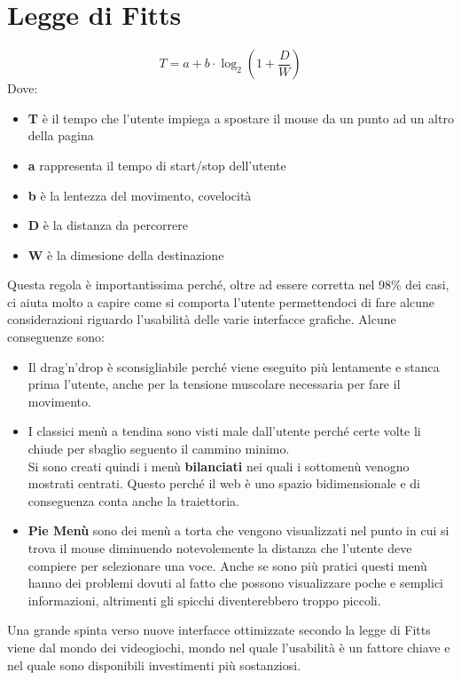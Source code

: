 \section{Legge di Fitts}
$$ T = a + b\cdot\log_{2}(1 + \frac{D}{W}) $$
Dove:
\begin{itemize}
\item \textbf{T} è il tempo che l'utente impiega a spostare il mouse da un punto ad un altro della pagina
\item \textbf{a} rappresenta il tempo di start/stop dell'utente
\item \textbf{b} è la lentezza del movimento, covelocità
\item \textbf{D} è la distanza da percorrere
\item \textbf{W} è la dimesione della destinazione
\end{itemize}
Questa regola è importantissima perché, oltre ad essere corretta nel 98\% dei casi, ci aiuta molto a capire come si comporta l'utente permettendoci di fare alcune considerazioni riguardo l'usabilità delle varie interfacce grafiche.
Alcune conseguenze sono:
\begin{itemize}
\item Il drag'n'drop è sconsigliabile perché viene eseguito più lentamente e stanca prima l'utente, anche per la tensione muscolare necessaria per fare il movimento.
\item I classici menù a tendina sono visti male dall'utente perché certe volte li chiude per sbaglio seguento il cammino minimo. \\
Si sono creati quindi i menù \textbf{bilanciati} nei quali i sottomenù venogno mostrati centrati. Questo perché il web è uno spazio bidimensionale e di conseguenza conta anche la traiettoria.
\item \textbf{Pie Menù} sono dei menù a torta che vengono visualizzati nel punto in cui si trova il mouse diminuendo notevolemente la distanza che l'utente deve compiere per selezionare una voce. Anche se sono più pratici questi menù hanno dei problemi dovuti al fatto che possono visualizzare poche e semplici informazioni, altrimenti gli spicchi diventerebbero troppo piccoli.
\end{itemize}
Una grande spinta verso nuove interfacce ottimizzate secondo la legge di Fitts viene dal mondo dei videogiochi, mondo nel quale l'usabilità è un fattore chiave e nel quale sono disponibili investimenti più sostanziosi.

